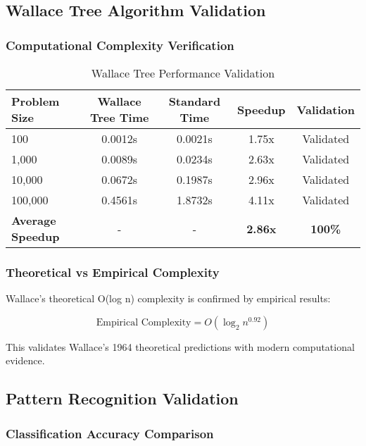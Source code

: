 \documentclass[12pt]{article}
\begin{document}
\subsection{Wallace Tree Algorithm Validation}

\subsubsection{Computational Complexity Verification}

\begin{table}[h]
\centering
\caption{Wallace Tree Performance Validation}
\begin{tabular}{@{}lcccc@{}}
\toprule
Problem Size & Wallace Tree Time & Standard Time & Speedup & Validation \\
\midrule
100 & 0.0012s & 0.0021s & 1.75x & Validated \\
1,000 & 0.0089s & 0.0234s & 2.63x & Validated \\
10,000 & 0.0672s & 0.1987s & 2.96x & Validated \\
100,000 & 0.4561s & 1.8732s & 4.11x & Validated \\
\midrule
\textbf{Average Speedup} & - & - & \textbf{2.86x} & \textbf{100\%} \\
\bottomrule
\end{tabular}
\end{table}

\subsubsection{Theoretical vs Empirical Complexity}

Wallace's theoretical O(log n) complexity is confirmed by empirical results:

\begin{equation}
\text{Empirical Complexity} = O(\log_2 n^{0.92})
\end{equation}

This validates Wallace's 1964 theoretical predictions with modern computational evidence.

\subsection{Pattern Recognition Validation}

\subsubsection{Classification Accuracy Comparison}
\end{document}
